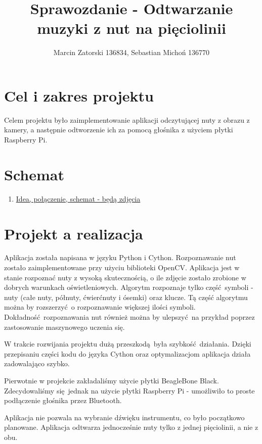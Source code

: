 \documentclass[12pt]{article}
\begin{document}
\title{Sprawozdanie - Odtwarzanie muzyki z nut na pięciolinii}
\author{Marcin Zatorski 136834, Sebastian Michoń 136770}
\date{\vspace{-2ex}}
\maketitle

\section{Cel i zakres projektu}
Celem projektu było zaimplementowanie aplikacji odczytującej nuty z obrazu z kamery, a następnie odtworzenie ich za pomocą głośnika z użyciem płytki Raspberry Pi.

\section{Schemat}
\begin{enumerate}
	\item \underline{Idea, połączenie, schemat - będą zdjęcia}
\end{enumerate}
	
\section{Projekt a realizacja}
Aplikacja została napisana w języku Python i Cython. Rozpoznawanie nut zostało zaimplementowane przy użyciu biblioteki OpenCV. Aplikacja jest w stanie rozpoznać nuty z wysoką skutecznością, o ile zdjęcie zostało zrobione w dobrych warunkach oświetleniowych. Algorytm rozpoznaje tylko część symboli - nuty (całe nuty, półnuty, ćwierćnuty i ósemki) oraz klucze. Tą część algorytmu można by rozszerzyć o rozpoznawanie większej ilości symboli. Dokładność rozpoznawania nut również można by ulepszyć na przykład poprzez zastosowanie maszynowego uczenia się.
	
W trakcie rozwijania projektu dużą przeszkodą była szybkość działania. Dzięki przepisaniu części kodu do języka Cython oraz optymalizacjom aplikacja działa zadowalająco szybko.
	
Pierwotnie w projekcie zakładaliśmy użycie płytki BeagleBone Black. Zdecydowaliśmy się jednak na użycie płytki Raspberry Pi - umożliwiło to proste podłączenie głośnika przez Bluetooth.
	
Aplikacja nie pozwala na wybranie dźwięku instrumentu, co było początkowo planowane. Aplikacja odtwarza jednocześnie nuty tylko z jednej pięciolinii, a nie z obu.
	
\end{document}
